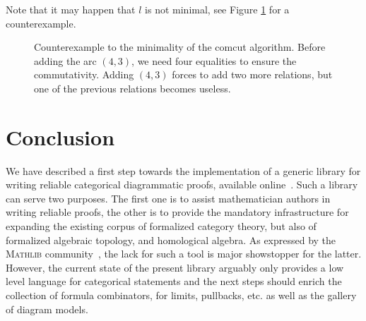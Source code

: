 \begin{remark}
Note that it may happen that $l$ is not minimal, see Figure \ref{fig:counter-example_comcut} for a counterexample.
\begin{figure}[h]
  \begin{center}
  \end{center}
  \caption{Counterexample to the minimality of the comcut algorithm. Before adding the arc $(4,3)$, we need four equalities to ensure the commutativity. Adding $(4,3)$ forces to add two more relations, but one of the previous relations becomes useless. \label{fig:counter-example_comcut}}
\end{figure}
\end{remark}





\section{Conclusion}\label{sec:concl}

We have described a first step towards the implementation of a generic library for writing reliable categorical diagrammatic proofs, available online~\cite{repo}. Such a library can serve two purposes. The first one is to assist mathematician authors in writing reliable proofs, the other is to provide the mandatory infrastructure for expanding the existing corpus of formalized category theory, but also of formalized algebraic topology, and homological algebra. As expressed by the \textsc{Mathlib} community~\cite{mathlibzulip}, the lack for such a tool is major showstopper for the latter. However, the current state of the present library arguably only provides a low level language for categorical statements and the next steps should enrich the collection of formula combinators, \eg{} for limits, pullbacks, etc. as well as the gallery of diagram models.

